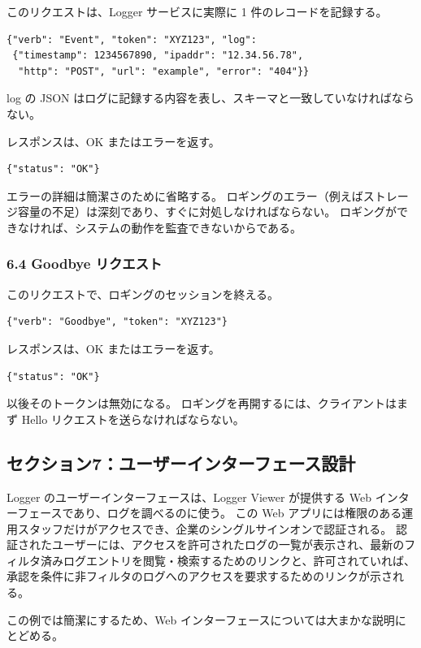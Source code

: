 \documentclass[uplatex]{jsarticle}
\begin{document}
このリクエストは、Logger サービスに実際に 1 件のレコードを記録する。
\begin{verbatim}
{"verb": "Event", "token": "XYZ123", "log":
 {"timestamp": 1234567890, "ipaddr": "12.34.56.78",
  "http": "POST", "url": "example", "error": "404"}}
\end{verbatim}
log の JSON はログに記録する内容を表し、スキーマと一致していなければならない。

レスポンスは、OK またはエラーを返す。
\begin{verbatim}
{"status": "OK"}
\end{verbatim}
エラーの詳細は簡潔さのために省略する。
ロギングのエラー（例えばストレージ容量の不足）は深刻であり、すぐに対処しなければならない。
ロギングができなければ、システムの動作を監査できないからである。

\subsubsection{6.4 Goodbye リクエスト}

このリクエストで、ロギングのセッションを終える。
\begin{verbatim}
{"verb": "Goodbye", "token": "XYZ123"}
\end{verbatim}
レスポンスは、OK またはエラーを返す。
\begin{verbatim}
{"status": "OK"}
\end{verbatim}
以後そのトークンは無効になる。
ロギングを再開するには、クライアントはまず Hello リクエストを送らなければならない。

\subsection{セクション7：ユーザーインターフェース設計}

Logger のユーザーインターフェースは、Logger Viewer が提供する Web インターフェースであり、ログを調べるのに使う。
この Web アプリには権限のある運用スタッフだけがアクセスでき、企業のシングルサインオンで認証される。
認証されたユーザーには、アクセスを許可されたログの一覧が表示され、最新のフィルタ済みログエントリを閲覧・検索するためのリンクと、許可されていれば、承認を条件に非フィルタのログへのアクセスを要求するためのリンクが示される。

この例では簡潔にするため、Web インターフェースについては大まかな説明にとどめる。
\end{document}
